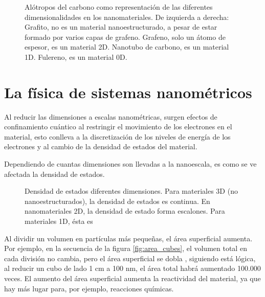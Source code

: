 \begin{figure}
	\centering
	\caption{Alótropos del carbono como representación de las diferentes dimensionalidades en los nanomateriales. De izquierda a derecha: Grafito, no es un material nanoestructurado, a pesar de estar formado por varios capas de grafeno. Grafeno, solo un átomo de espesor, es un material 2D. Nanotubo de carbono, es un material 1D. Fulereno, es un material 0D.}
	\label{fig:carbon_allotropes}
\end{figure}

\section*{La física de sistemas nanométricos}


Al reducir las dimensiones a escalas nanométricas, surgen efectos de confinamiento cuántico al restringir el movimiento de los electrones en el material, esto conlleva a la discretización de los niveles de energía de los electrones y al cambio de la densidad de estados del material. 


Dependiendo de cuantas dimensiones son llevadas a la nanoescala, es como se ve afectada la densidad de estados.

\begin{figure}[h!]
	\centering
	\caption{Densidad de estados diferentes dimensiones. Para materiales 3D (no nanoestructurados), la densidad de estados es continua. En nanomateriales 2D, la densidad de estado forma escalones. Para materiales 1D, ésta es}
	\label{fig:DoE}
\end{figure}

Al dividir un volumen en partículas más pequeñas, el área superficial aumenta. Por ejemplo, en la secuencia de la figura \ref{fig:area_cubes}, el volumen total en cada división no cambia, pero el área superficial se dobla \footnotemark, siguiendo está lógica, al reducir un cubo de lado 1 cm a 100 nm, el área total habrá aumentado 100.000 veces. El aumento del área superficial aumenta la reactividad del material, ya que hay más lugar para, por ejemplo, reacciones químicas.

\enlargethispage{\baselineskip}

